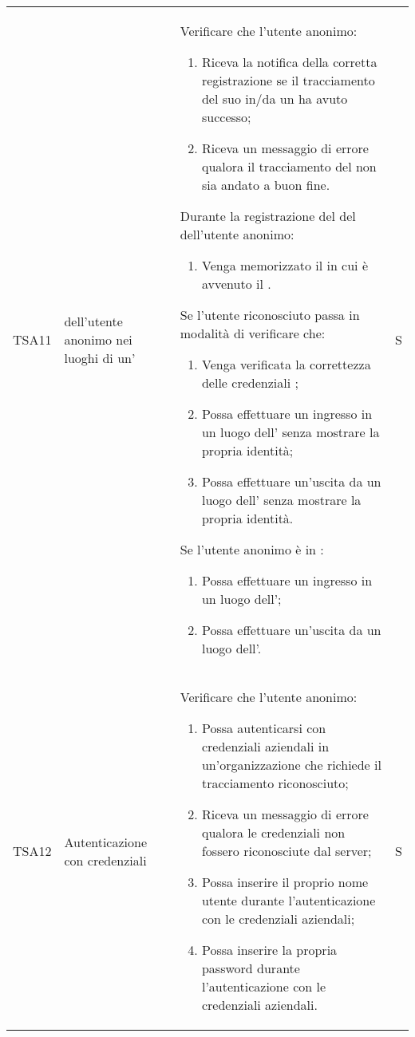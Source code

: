 {\begin{longtable}{ c  C{2.5cm}  C{10cm} C{1cm}}
TSA11 &  dell'utente anonimo nei luoghi di un' &
Verificare che l'utente anonimo:
\begin{enumerate}
    \item Riceva la notifica della corretta registrazione se il tracciamento del suo  in/da un  ha avuto successo;
    \item Riceva un messaggio di errore qualora il tracciamento del  non sia andato a buon fine.
\end{enumerate}
Durante la registrazione del  del  dell'utente anonimo:
\begin{enumerate}[resume]
    \item Venga memorizzato il  in cui è avvenuto il .
\end{enumerate}
Se l'utente riconosciuto passa in modalità di  verificare che:
\begin{enumerate}[resume]
    \item Venga verificata la correttezza delle credenziali ;
    \item Possa effettuare un ingresso in un luogo dell' senza mostrare la propria identità;
    \item Possa effettuare un'uscita da un luogo dell' senza mostrare la propria identità.
\end{enumerate}
Se l'utente anonimo è in :
\begin{enumerate}[resume]
    \item Possa effettuare un ingresso in un luogo dell';
    \item Possa effettuare un'uscita da un luogo dell'.
\end{enumerate} & S \\


TSA12 & Autenticazione con credenziali  &
Verificare che l'utente anonimo:
\begin{enumerate}
    \item Possa autenticarsi con credenziali aziendali in un'organizzazione che richiede il tracciamento riconosciuto;
    \item Riceva un messaggio di errore qualora le credenziali  non fossero riconosciute dal server;
    \item Possa inserire il proprio nome utente durante l'autenticazione con le credenziali  aziendali;
    \item Possa inserire la propria password durante l'autenticazione con le credenziali  aziendali.
\end{enumerate} & S \\


\end{longtable}}
